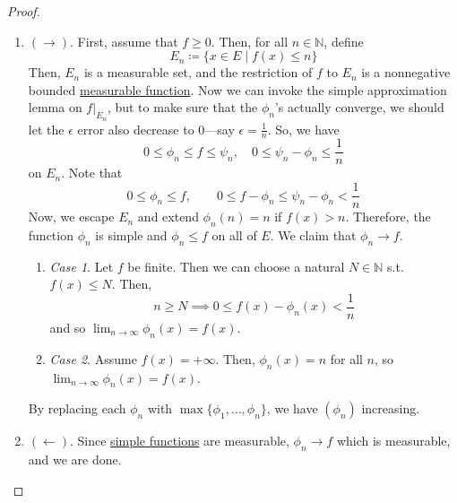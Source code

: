 \begin{proof}
    \begin{enumerate}
      \item $(\rightarrow)$. First, assume that $f \geq 0$. Then, for all $n \in \mathbb{N}$, define 
      \begin{equation}
        E_n \coloneqq \{ x \in E \mid f(x) \leq n \}
      \end{equation}
      Then, $E_n$ is a measurable set, and the restriction of $f$ to $E_n$ is a nonnegative bounded \hyperref[def:measurable-function]{measurable function}. Now we can invoke the simple approximation lemma on $f|_{E_n}$, but to make sure that the $\phi_n$'s actually converge, we should let the $\epsilon$ error also decrease to $0$---say $\epsilon = \frac{1}{n}$. So, we have 
      \begin{equation}
        0 \leq \phi_n \leq f \leq \psi_n, \quad 0 \leq \psi_n - \phi_n \leq \frac{1}{n}
      \end{equation}
      on $E_n$. Note that 
      \begin{equation}
        0 \leq \phi_n \leq f, \qquad 0 \leq f - \phi_n \leq \psi_n - \phi_n < \frac{1}{n} 
      \end{equation}
      Now, we escape $E_n$ and extend $\phi_n (n) = n$ if $f(x) > n$. Therefore, the function $\phi_n$ is simple and $\phi_n \leq f$ on all of $E$. We claim that $\phi_n \to f$. 
      \begin{enumerate}
        \item \textit{Case 1}. Let $f$ be finite. Then we can choose a natural $N \in \mathbb{N}$ s.t. $f(x) \leq N$. Then, 
        \begin{equation}
          n \geq N \implies 0 \leq f(x) - \phi_n (x) < \frac{1}{n} 
        \end{equation}
        and so $\lim_{n \to \infty} \phi_n (x) = f(x)$. 

        \item \textit{Case 2}. Assume $f(x) = +\infty$. Then, $\phi_n (x) = n$ for all $n$, so $\lim_{n \to \infty} \phi_n (x) = f(x)$. 
      \end{enumerate}
      By replacing each $\phi_n$ with $\max\{\phi_1, \ldots, \phi_n\}$, we have $(\phi_n)$ increasing. 

      \item $(\leftarrow)$. Since \hyperref[def:simple-functions]{simple functions} are measurable, $\phi_n \to f$ which is measurable, and we are done. 
    \end{enumerate}


\end{proof}

